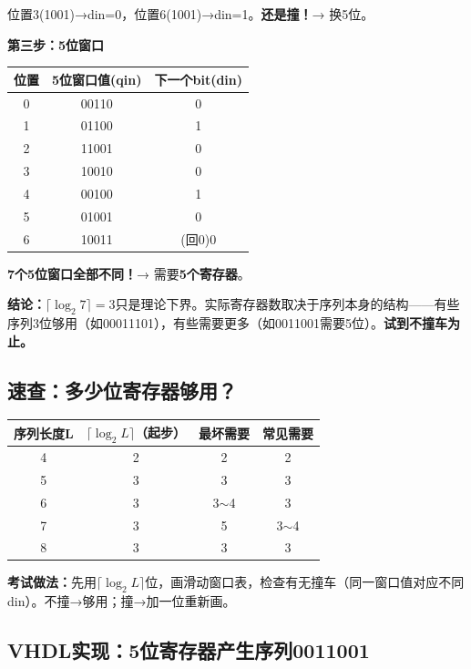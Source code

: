 位置3(1001)→din=0，位置6(1001)→din=1。\textbf{还是撞！}→ 换5位。

\textbf{第三步：5位窗口}

\begin{center}
\begin{tabular}{c|c|c}
位置 & 5位窗口值(qin) & 下一个bit(din) \\
\hline
0 & 00110 & 0 \\
1 & 01100 & 1 \\
2 & 11001 & 0 \\
3 & 10010 & 0 \\
4 & 00100 & 1 \\
5 & 01001 & 0 \\
6 & 10011 & (回0)0 \\
\hline
\end{tabular}
\end{center}

\textbf{7个5位窗口全部不同！}→ 需要\textbf{5个寄存器}。

\textbf{结论：}$\lceil\log_2 7\rceil = 3$只是理论下界。实际寄存器数取决于序列本身的结构——有些序列3位够用（如00011101），有些需要更多（如0011001需要5位）。\textbf{试到不撞车为止。}

\subsection{速查：多少位寄存器够用？}

\begin{center}
\begin{tabular}{|c|c|c|c|}
\hline
序列长度L & $\lceil\log_2 L\rceil$（起步） & 最坏需要 & 常见需要 \\
\hline
4 & 2 & 2 & 2 \\
5 & 3 & 3 & 3 \\
6 & 3 & 3$\sim$4 & 3 \\
7 & 3 & 5 & 3$\sim$4 \\
8 & 3 & 3 & 3 \\
\hline
\end{tabular}
\end{center}

\textbf{考试做法：}先用$\lceil\log_2 L\rceil$位，画滑动窗口表，检查有无撞车（同一窗口值对应不同din）。不撞→够用；撞→加一位重新画。

\subsection{VHDL实现：5位寄存器产生序列0011001}

